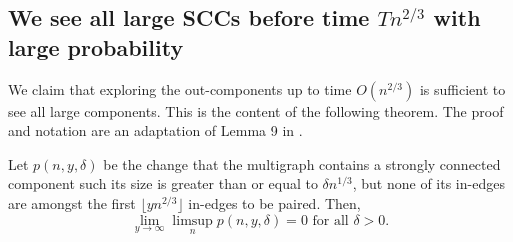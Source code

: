 \subsection{We see all large SCCs before time $Tn^{2/3}$ with large probability}
We claim that exploring the out-components up to time $O(n^{2/3})$ is sufficient to see all large components. This is the content of the following theorem. The proof and notation are an adaptation of Lemma 9 in \cite{Aldous1991}.
\begin{lemma}
Let $p(n,y,\delta)$ be the change that the multigraph contains a strongly connected component such its size is greater than or equal to $\delta n^{1/3}$, but none of its in-edges are amongst the first $\lfloor yn^{2/3}\rfloor$ in-edges to be paired. Then,
$$\lim_{y\to \infty}\limsup_{n} p(n,y,\delta)=0\text{ for all }\delta>0.$$
\end{lemma}
